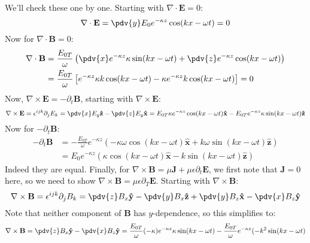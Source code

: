 \documentclass[10pt]{article}
\begin{document}
\begin{enumerate}[label=(\alph*)]
			\begin{solution}
				We'll check these one by one. Starting with \( \nabla \cdot \mathbf{E} = 0 \):
				\[
					\nabla \cdot \mathbf{E} = \pdv{y} E_0e^{-\kappa z}\cos (kx - \omega t) = 0
				\]
				Now for \( \nabla \cdot \mathbf{B} = 0 \): 
				\begin{align*}
					\nabla \cdot \mathbf{B} &= \frac{E_{0T}}{\omega}\left( \pdv{x} e^{-\kappa z} \kappa \sin
					(kx - \omega t) + \pdv{z} e^{-\kappa z}\cos(kx - \omega t) \right)\\
					&= \frac{E_{0T}}{\omega}\left[ e^{-\kappa z}\kappa k \cos(kx - \omega t) - \kappa e^{-\kappa
					z} k \cos(kx - \omega t) \right] = 0 
				\end{align*}
				Now, \( \nabla \times \mathbf{E} = -\partial_t \mathbf{B} \), starting with \( \nabla \times
				\mathbf{E}\):
				\[
					\nabla \times \mathbf{E} = \epsilon^{ijk}\partial_j E_k = \pdv{x} E_y \mathbf{\hat{z}} -
					\pdv{z} E_y \mathbf{\hat{x}} = E_{0T} \kappa e^{-\kappa z}\cos (kx - \omega t)
					\mathbf{\hat{x}} - E_{0T} e^{-\kappa z} \kappa \sin(kx - \omega t) \mathbf{\hat{z}}
				\]
				Now for \( -\partial_t \mathbf{B} \):
				\begin{align*}
					-\partial_t \mathbf{B} &= -\frac{E_{0T}}{\omega} e^{-\kappa z}\left( -\kappa \omega
					\cos(kx - \omega t) \mathbf{\hat{x}} + k \omega \sin(kx - \omega t) \mathbf{\hat{z}}
				\right)\\
				&= E_0 e^{-\kappa z}(\kappa \cos (kx - \omega t) \mathbf{\hat{x}} - k \sin (kx - \omega t)
				\mathbf{\hat{z}})
				\end{align*}
				Indeed they are equal. Finally, for \( \nabla \times \mathbf{B} = \mu \mathbf{J} + \mu
				\epsilon \partial_t \mathbf{E} \), we first note that \( \mathbf{J} = 0 \) here, so we need
				to show \( \nabla \times \mathbf{B} = \mu \epsilon \partial_T \mathbf{E} \). Starting with \(
				\nabla \times \mathbf{B}\):
				\[
					\nabla \times \mathbf{B} = \epsilon^{ijk}\partial_j B_k = \pdv{z}B_x \mathbf{\hat{y}} -
					\pdv{y} B_x \mathbf{\hat{z}} + \pdv{y} B_z \mathbf{\hat{x}} - \pdv{x} B_z \mathbf{\hat{y}}
				\]
				Note that neither component of \( \mathbf{B} \) has \( y \)-dependence, so this simplifies
				to:
				\begin{multline*}
					\nabla \times \mathbf{B} = \pdv{z}B_x \mathbf{\hat{y}} - \pdv{x} B_z \mathbf{\hat{y}} =
					\frac{E_{0T}}{\omega}(-\kappa) e^{-\kappa z}\kappa \sin (kx - \omega t) -
					\frac{E_{0T}}{\omega} e^{-\kappa z}(-k^2 \sin (kx - \omega t) \\

\end{multline*}
\end{solution}
\end{enumerate}
\end{document}
